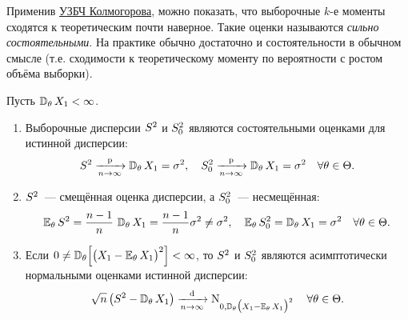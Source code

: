 \begin{rmrk}
    Применив \hyperlink{SLLN}{УЗБЧ Колмогорова}, можно показать, что выборочные $k$-е моменты сходятся к теоретическим почти наверное. 
    Такие оценки называются \textit{сильно состоятельными}. На практике обычно достаточно и состоятельности в обычном смысле (т.е. сходимости к теоретическому моменту по вероятности с ростом объёма выборки).
\end{rmrk}

\begin{thm*}
    Пусть $\operatorname{\mathbb{D}_{\theta}} X_{1}<\infty$.
    \begin{enumerate}
        \item Выборочные дисперсии $S^{2}$ и $S^{2}_0$ являются состоятельными оценками для истинной дисперсии:
            \begin{equation*}
                S^{2} \xrightarrow[n \to \infty]{\text{p}} \operatorname{\mathbb{D}_{\theta}} X_{1}=\sigma^{2}, \quad S_{0}^{2} \xrightarrow[n \to \infty]{\text{p}} \operatorname{\mathbb{D}_{\theta}} X_{1}=\sigma^{2} \quad \forall \theta \in \Theta.
            \end{equation*}
        \item $S^{2}$~--- смещённая оценка дисперсии, а $S^{2}_0$~--- несмещённая:
            \begin{equation*}
                \operatorname{\operatorname{\mathbb{E}}_{\theta}} S^{2}=\frac{n-1}{n} \, \operatorname{\mathbb{D}_{\theta}} X_{1}=\frac{n-1}{n} \sigma^{2} \neq \sigma^{2}, \quad \operatorname{\operatorname{\mathbb{E}}_{\theta}}  S_{0}^{2}=\operatorname{\mathbb{D}_{\theta}}  X_{1}=\sigma^{2} \quad \forall \theta \in \Theta.
            \end{equation*}
        \item Если $0 \neq \operatorname{\mathbb{D}_{\theta}} \Bigl[ \bigl(X_{1}-\operatorname{\operatorname{\mathbb{E}}_{\theta}} X_{1}\bigr)^{2} \Bigr] <\infty$, то $S^{2}$ и $S^{2}_0$ являются асимптотически нормальными оценками истинной дисперсии:
            \begin{equation*}
                \sqrt{n}\left(S^{2}-\operatorname{\mathbb{D}_{\theta}}  X_{1}\right) \xrightarrow[n \to \infty]{\text{d}} \operatorname{\mathrm{N}}_{0, \operatorname{\mathbb{D}_{\theta}} \bigl(X_{1}-\operatorname{\operatorname{\mathbb{E}}_{\theta}}  X_{1}\bigr)^{2}} \quad \forall \theta \in \Theta.
            \end{equation*}
    \end{enumerate}
\end{thm*}


